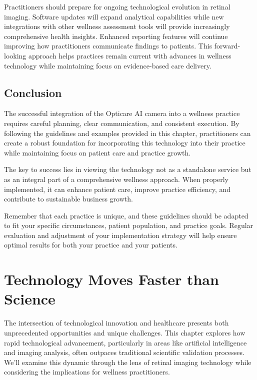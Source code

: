 \documentclass[
  Letterpaper,
]{scrbook}
\begin{document}
Practitioners should prepare for ongoing technological evolution in
retinal imaging. Software updates will expand analytical capabilities
while new integrations with other wellness assessment tools will provide
increasingly comprehensive health insights. Enhanced reporting features
will continue improving how practitioners communicate findings to
patients. This forward-looking approach helps practices remain current
with advances in wellness technology while maintaining focus on
evidence-based care delivery.

\section{Conclusion}\label{conclusion-1}

The successful integration of the Opticare AI camera into a wellness
practice requires careful planning, clear communication, and consistent
execution. By following the guidelines and examples provided in this
chapter, practitioners can create a robust foundation for incorporating
this technology into their practice while maintaining focus on patient
care and practice growth.

The key to success lies in viewing the technology not as a standalone
service but as an integral part of a comprehensive wellness approach.
When properly implemented, it can enhance patient care, improve practice
efficiency, and contribute to sustainable business growth.

Remember that each practice is unique, and these guidelines should be
adapted to fit your specific circumstances, patient population, and
practice goals. Regular evaluation and adjustment of your implementation
strategy will help ensure optimal results for both your practice and
your patients.


\chapter{Technology Moves Faster than
Science}\label{technology-moves-faster-than-science}

The intersection of technological innovation and healthcare presents
both unprecedented opportunities and unique challenges. This chapter
explores how rapid technological advancement, particularly in areas like
artificial intelligence and imaging analysis, often outpaces traditional
scientific validation processes. We'll examine this dynamic through the
lens of retinal imaging technology while considering the implications
for wellness practitioners.
\end{document}
